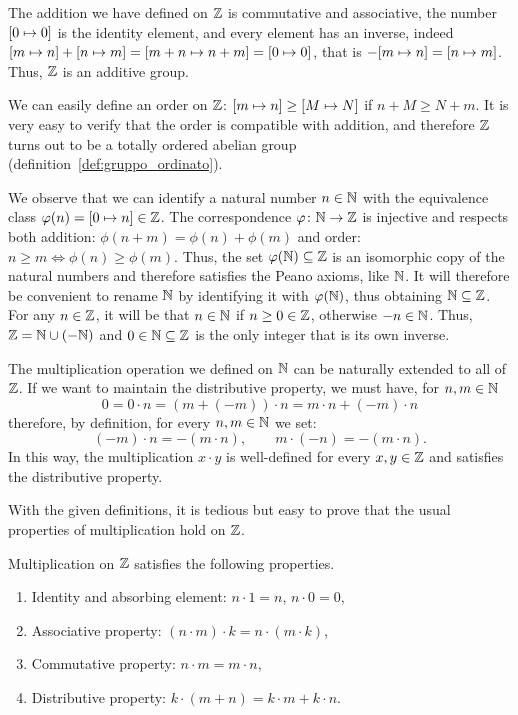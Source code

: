 The addition we have defined on ${\mathbb Z}$ is commutative and associative, the number
${\left[ 0 \mapsto 0 \right]}$ is the identity element, and every element has an
inverse, indeed ${\left[ m \mapsto n \right]} + {\left[ n \mapsto m \right]} = {\left[ m+n
\mapsto n+m \right]} = {\left[ 0\mapsto 0 \right]}$, that is $-{\left[ m \mapsto
n \right]}={\left[ n\mapsto m \right]}$. Thus, ${\mathbb Z}$ is an additive group.

We can easily define an order on ${\mathbb Z}$: ${\left[ m\mapsto n \right]} \ge
{\left[ M\mapsto N \right]}$ if $n+M\ge N+m$. It is very easy to verify that the order
is compatible with addition, and therefore ${\mathbb Z}$ turns out to be a totally
ordered abelian group (definition~\ref{def:gruppo_ordinato}).

We observe that we can identify a natural number $n\in {\mathbb N}$ with the equivalence
class $\varphi(n) = {\left[ 0\mapsto n \right]}\in {\mathbb Z}$. The correspondence $\varphi\colon
{\mathbb N}\to{\mathbb Z}$ is injective and respects both addition: $\phi(n+m) =
\phi(n)+\phi(m)$ and order: $n\ge m \iff \phi(n)\ge \phi(m)$. Thus, the set
$\varphi({\mathbb N})\subseteq {\mathbb Z}$ is an isomorphic copy of the natural numbers and
therefore satisfies the Peano axioms, like ${\mathbb N}$.
%
It will therefore be convenient to rename ${\mathbb N}$ by identifying it with
$\varphi({\mathbb N})$, thus obtaining ${\mathbb N}\subseteq {\mathbb Z}$. For any $n\in {\mathbb Z}$, it will be
that $n\in {\mathbb N}$ if $n\ge 0\in {\mathbb Z}$, otherwise $-n\in {\mathbb N}$. Thus, ${\mathbb Z} = {\mathbb N} \cup
(-{\mathbb N})$ and $0\in {\mathbb N}\subseteq {\mathbb Z}$ is the only integer that is its own inverse.

The multiplication operation we defined on ${\mathbb N}$ can be naturally extended to
all of ${\mathbb Z}$. If we want to maintain the distributive property, we must have,
for $n,m\in{\mathbb N}$
\[
  0 = 0 \cdot n = (m+(-m))\cdot n = m\cdot n + (-m)\cdot n
\]
therefore, by definition, for every $n,m\in {\mathbb N}$ we set:
\[
  (-m) \cdot n = -(m\cdot n), \qquad  m \cdot (-n) = -(m\cdot n).
\]
In this way, the multiplication $x\cdot y$ is well-defined for every $x,y\in
{\mathbb Z}$ and satisfies the distributive property.

With the given definitions, it is tedious but easy to prove that the usual
properties of multiplication hold on ${\mathbb Z}$.

\begin{theorem}
  Multiplication on ${\mathbb Z}$ satisfies the following properties.
  \begin{enumerate}
    \item[1.] Identity and absorbing element: $n\cdot 1 = n$, $n\cdot 0 = 0$,
    \item[2.] Associative property: $(n\cdot m)\cdot k = n \cdot (m\cdot k)$,
    \item[3.] Commutative property: $n\cdot m = m\cdot n$,
    \item[4.] Distributive property: $k\cdot(m+n) = k\cdot m + k\cdot n$. 
  \end{enumerate}
\end{theorem}

